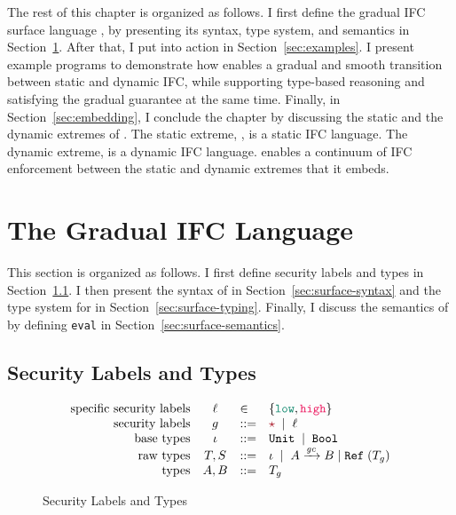 {The rest of this chapter is organized as follows. I first define the gradual IFC
surface language \Surface, by presenting its syntax, type system, and semantics
in Section~\ref{sec:surface-def}. After that, I put \Surface into action in
Section~\ref{sec:examples}. I present example programs to demonstrate how
\Surface enables a gradual and smooth transition between static and dynamic IFC,
while supporting type-based reasoning and satisfying the gradual guarantee at
the same time. Finally, in Section~\ref{sec:embedding}, I conclude the chapter
by discussing the static and the dynamic extremes of \Surface. The static
extreme, \SSLRef, is a static IFC language. The dynamic extreme, \DynIFC is a
dynamic IFC language. \Surface enables a continuum of IFC enforcement between
the static and dynamic extremes that it embeds.
}  %

\section{The Gradual IFC Language \Surface}
\label{sec:surface-def}

This section is organized as follows. I first define security labels and types
in Section~\ref{sec:labels-and-types}. I then present the syntax of \Surface in
Section~\ref{sec:surface-syntax} and the type system for \Surface in
Section~\ref{sec:surface-typing}. Finally, I discuss the semantics of \Surface
by defining \texttt{eval} in Section~\ref{sec:surface-semantics}.

\subsection{Security Labels and Types}
\label{sec:labels-and-types}

\begin{figure}[tbp]
\raggedright
  {\small
  \[
  \begin{array}{rcll}
    \text{specific security labels} & \ell & \in & \{ \low , \high \} \\
    \text{security labels}  & g    & ::= & \unk \MID \ell \\
    \text{base types}               & \iota     & ::= & \Unit \MID \Bool \\
    \text{raw types}                & T, S      & ::= & \iota \MID \Fun{A}{\gc}{B} \mid \Refer{(T_g)} \\
    \text{types}                    & A, B      & ::= & T_g \\
  \end{array}
  \]}
  \caption{Security Labels and Types}
  \label{fig:labels-and-types}
\end{figure}

